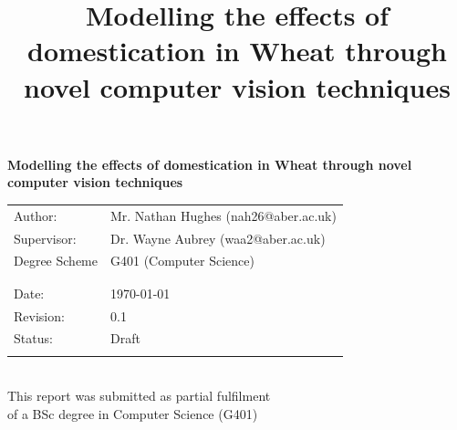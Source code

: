 \documentclass[11pt]{report}
\date{}
\title{\textbf{Modelling the effects of domestication in Wheat through novel computer vision techniques}}
\begin{document}

  \titleformat{\chapter}[display]
     {\normalfont\huge\bfseries}{\chaptertitlename\ \thechapter}{20pt}{\Huge}
  \titlespacing*{\chapter}{10pt}{10pt}{10pt}





  \thispagestyle{empty}
  \renewcommand{\headrulewidth}{0pt}
  \begin{center}
    \fontsize{10}{12}
    \selectfont

    \textbf{\huge Modelling the effects of domestication in Wheat through novel computer vision techniques}

    \vspace{0.3in}

    \begin{tabular}[t]{ll}
      Author: & Mr. Nathan Hughes (nah26@aber.ac.uk) \\
      Supervisor: & Dr. Wayne Aubrey (waa2@aber.ac.uk) \\
      Degree Scheme &  G401 \hspace*{0.05in}(Computer Science)\\
      \\
      \\
      Date: & \today \\
      Revision: & 0.1\\
      Status: & Draft\\
      \\
    \end{tabular}
    \\
    \vspace{0.1in}
    This report was submitted as partial fulfilment \\of a BSc degree in Computer Science (G401)
  \end{center}
  \clearpage
  \renewcommand{\headrulewidth}{1pt}
\end{document}
